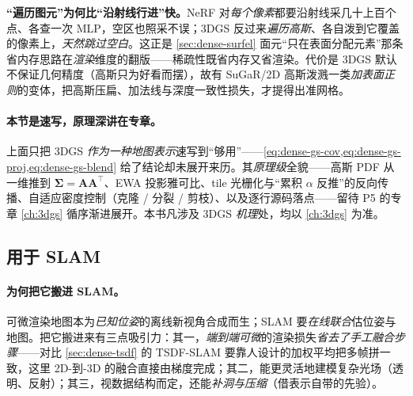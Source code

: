 \begin{insight}
\textbf{“遍历图元”为何比“沿射线行进”快。}NeRF 对\emph{每个像素}都要沿射线采几十上百个点、各查一次 MLP，空区也照采不误；3DGS 反过来\emph{遍历高斯}、各自泼到它覆盖的像素上，\emph{天然跳过空白}。这正是 \cref{sec:dense-surfel} 面元“只在表面分配元素”那条省内存思路在\emph{渲染}维度的翻版——稀疏性既省内存又省渲染。代价是 3DGS 默认不保证几何精度（高斯只为好看而摆），故有 SuGaR/2D 高斯泼溅一类\emph{加表面正则}的变体，把高斯压扁、加法线与深度一致性损失，才提得出准网格。
\end{insight}

\paragraph{本节是速写，原理深讲在专章。}上面只把 3DGS \emph{作为一种地图表示}速写到“够用”——\cref{eq:dense-gs-cov,eq:dense-gs-proj,eq:dense-gs-blend} 给了结论却未展开来历。其\emph{原理级}全貌——高斯 PDF 从一维推到 $\boldsymbol{\Sigma}=\mathbf{A}\mathbf{A}^\top$、EWA 投影雅可比、tile 光栅化与“累积 $\alpha$ 反推”的反向传播、自适应密度控制（克隆 / 分裂 / 剪枝）、以及逐行源码落点——留待 P5 的专章 \cref{ch:3dgs} 循序渐进展开。本书凡涉及 3DGS \emph{机理}处，均以 \cref{ch:3dgs} 为准。

\subsection{用于 SLAM}
\label{sec:dense-radiance-slam}

\paragraph{为何把它搬进 SLAM。}
可微渲染地图本为\emph{已知位姿}的离线新视角合成而生；SLAM 要\emph{在线联合}估位姿与地图。把它搬进来有三点吸引力\cite{matsuki2024monogs}：其一，\emph{端到端可微}的渲染损失\emph{省去了手工融合步骤}——对比 \cref{sec:dense-tsdf} 的 TSDF-SLAM 要靠人设计的加权平均把多帧拼一致，这里 2D-到-3D 的融合直接由梯度完成；其二，能更灵活地建模复杂光场（透明、反射）；其三，视数据结构而定，还能\emph{补洞与压缩}（借表示自带的先验）。

